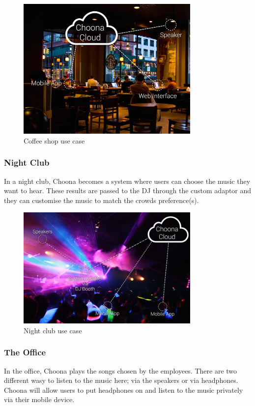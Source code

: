     \begin{figure}[h!]
      \centering
      \includegraphics[width=0.8\textwidth]{./img/coffee-shop.png}
      \caption{Coffee shop use case}
      \label{fig:coffee_shop}
    \end{figure}

\subsubsection{Night Club} 
In a night club, Choona becomes a system where users can choose the music they want to hear.  These results are passed to the DJ through the custom adaptor and they can customise the music to match the crowds preference(s).  \\

    \begin{figure}[h!]
      \centering
      \includegraphics[width=0.8\textwidth]{./img/nightclub.png}
      \caption{Night club use case}
      \label{fig:night_club}
    \end{figure}

\subsubsection{The Office} 
In the office, Choona plays the songs chosen by the employees.  There are two different wasy to listen to the music here; via the speakers or via headphones.  Choona will allow users to put headphones on and listen to the music privately via their mobile device. \\

